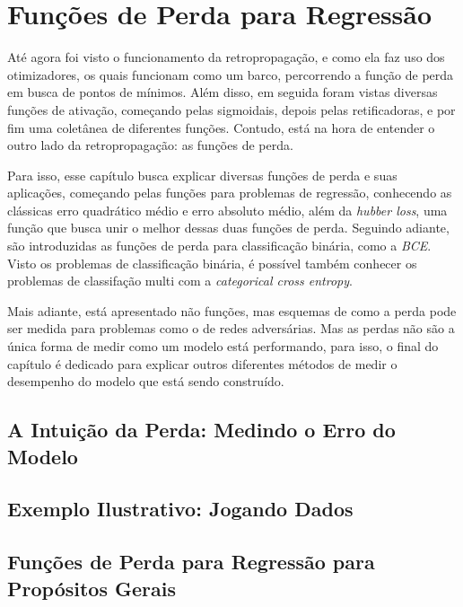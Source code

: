 
\chapter{Funções de Perda para Regressão}
\label{cap:perda-regressao}

Até agora foi visto o funcionamento da retropropagação, e como ela faz uso dos otimizadores, os quais funcionam como um barco, percorrendo a função de perda em busca de pontos de mínimos. Além disso, em seguida foram vistas diversas funções de ativação, começando pelas sigmoidais, depois pelas retificadoras, e por fim uma coletânea de diferentes funções. Contudo, está na hora de entender o outro lado da retropropagação: as funções de perda.

Para isso, esse capítulo busca explicar diversas funções de perda e suas aplicações, começando pelas funções para problemas de regressão, conhecendo as clássicas erro quadrático médio e erro absoluto médio, além da \textit{hubber loss}, uma função que busca unir o melhor dessas duas funções de perda. Seguindo adiante, são introduzidas as funções de perda para classificação binária, como a \textit{BCE}. Visto os problemas de classificação binária, é possível também conhecer os problemas de classifação multi com a \textit{categorical cross entropy}.

Mais adiante, está apresentado não funções, mas esquemas de como a perda pode ser medida para problemas como o de redes adversárias. Mas as perdas não são a única forma de medir como um modelo está performando, para isso, o final do capítulo é dedicado para explicar outros diferentes métodos de medir o desempenho do modelo que está sendo construído.

\section{A Intuição da Perda: Medindo o Erro do Modelo}

\section{Exemplo Ilustrativo: Jogando Dados}

\section{Funções de Perda para Regressão para Propósitos Gerais}

